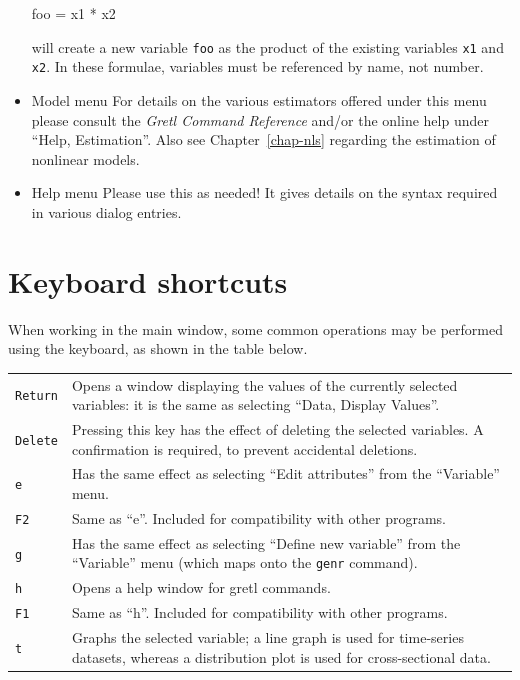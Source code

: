 \begin{itemize}
\begin{code} 
    foo = x1 * x2
\end{code}

  will create a new variable \verb+foo+ as the product of the existing
  variables \verb+x1+ and \verb+x2+.  In these formulae, variables
  must be referenced by name, not number.

\item \textsf{Model menu} For details on the various estimators
  offered under this menu please consult the \emph{Gretl Command
    Reference} and/or the online help under ``Help, Estimation''.
  Also see Chapter~\ref{chap-nls} regarding the estimation of nonlinear
  models.

\item \textsf{Help menu} Please use this as needed! It gives details
  on the syntax required in various dialog entries.
\end{itemize}


\section{Keyboard shortcuts}
\label{keyb-accel}

When working in the main  window, some common operations
may be performed using the keyboard, as shown in the table below.

\begin{center}
\begin{tabular}{lp{5in}}
\texttt{Return} & Opens a window displaying the values of the currently
  selected variables: it is the same as selecting ``Data, Display
  Values''. \\
\texttt{Delete} & Pressing this key has the effect of deleting the
  selected variables. A confirmation is required, to prevent
  accidental deletions. \\
\texttt{e} & Has the same effect as selecting ``Edit
  attributes'' from the ``Variable'' menu. \\
\texttt{F2} & Same as ``e''. Included for compatibility with other
  programs.\\
\texttt{g} & Has the same effect as selecting ``Define new
  variable'' from the ``Variable'' menu (which maps onto the
  \texttt{genr} command).\\
\texttt{h} & Opens a help window for gretl commands.\\
\texttt{F1} & Same as ``h''. Included for compatibility with other
  programs.\\
\texttt{t} & Graphs the selected variable; a line graph is used for
  time-series datasets, whereas a distribution plot is used for
  cross-sectional data. 
\end{tabular}
\end{center}

